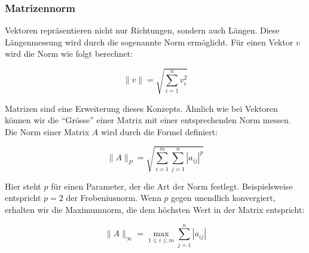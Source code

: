 \subsubsection{Matrizennorm}
Vektoren repräsentieren nicht nur Richtungen, sondern auch Längen. Diese Längenmessung wird durch die sogenannte Norm ermöglicht. Für einen Vektor $v$ wird die Norm wie folgt berechnet:

\begin{equation}
    \| v \| = \sqrt{\sum_{i=1}^{n} v_i^2}
    \label{eq:Vektornorm}
\end{equation}

Matrizen sind eine Erweiterung dieses Konzepts. Ähnlich wie bei Vektoren können wir die "`Grösse"' einer Matrix mit einer entsprechenden Norm messen. Die Norm einer Matrix $A$ wird durch die Formel definiert:

\begin{equation}
    \| A \|_P = \sqrt{\sum_{i=1}^{m} \sum_{j=1}^{n} |a_{ij}|^p}
    \label{eq:Matrixnorm}
\end{equation}

Hier steht $p$ für einen Parameter, der die Art der Norm festlegt. Beispielsweise entspricht $p=2$ der Frobeniusnorm. Wenn $p$ gegen unendlich konvergiert, erhalten wir die Maximumnorm, die dem höchsten Wert in der Matrix entspricht:

\begin{equation}
    \|A\|_{\infty} = \max_{1 \leq i \leq m} \sum_{j=1}^{n} |a_{ij}|
    \label{eq:Maximumnorm}
\end{equation}

